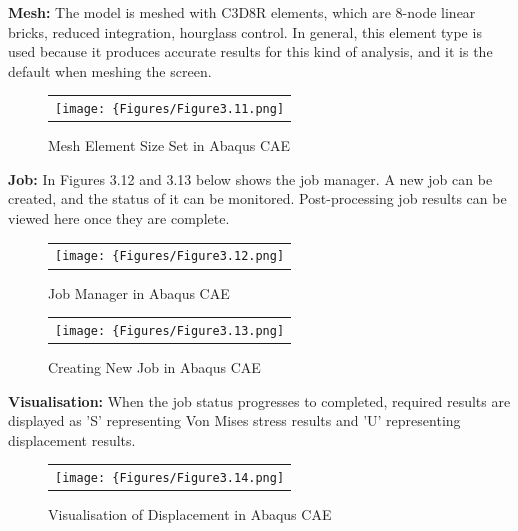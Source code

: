 \documentclass[a4paper,12pt]{article}
\numberwithin{equation}{section}
\numberwithin{figure}{section}
\begin{document}
\noindent \textbf{Mesh:} The model is meshed with C3D8R elements, which are 8-node linear bricks, reduced integration, hourglass control. In general, this element type is used because it produces accurate results for this kind of analysis, and it is the default when meshing the screen.\vspace{\baselineskip}

\begin{figure}[H]
  \centering
  \begin{tabular}{@{}c@{}}
    \texttt{[image: \{Figures/Figure3.11.png]}} \\
  \end{tabular}
  \caption {Mesh Element Size Set in Abaqus CAE}
\end{figure}

\noindent \textbf{Job:} In Figures 3.12 and 3.13 below shows the job manager. A new job can be created, and the status of it can be monitored. Post-processing job results can be viewed here once they are complete.\vspace{\baselineskip}

\begin{figure}[H]
  \centering
  \begin{tabular}{@{}c@{}}
    \texttt{[image: \{Figures/Figure3.12.png]}} \\
  \end{tabular}
  \caption {Job Manager in Abaqus CAE}
\end{figure}

\begin{figure}[H]
  \centering
  \begin{tabular}{@{}c@{}}
    \texttt{[image: \{Figures/Figure3.13.png]}} \\
  \end{tabular}
  \caption {Creating New Job in Abaqus CAE}
\end{figure}

\noindent \textbf{Visualisation:} When the job status progresses to completed, required results are displayed as ’S’ representing Von Mises stress results and ’U’ representing displacement results.\vspace{\baselineskip}

\begin{figure}[H]
  \centering
  \begin{tabular}{@{}c@{}}
    \texttt{[image: \{Figures/Figure3.14.png]}} \\
  \end{tabular}
  \caption {Visualisation of Displacement in Abaqus CAE}
\end{figure}
\end{document}

